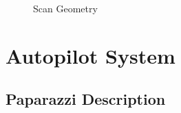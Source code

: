 \documentclass[a4paper,11pt]{report}
\begin{document}
\begin{figure}[ht]
  \centering
  \caption{Scan Geometry}
  \label{fig:geometry}
\end{figure}

\section{Autopilot System}
\label{sec:paparazzi}

\subsection{Paparazzi Description}
\end{document}
